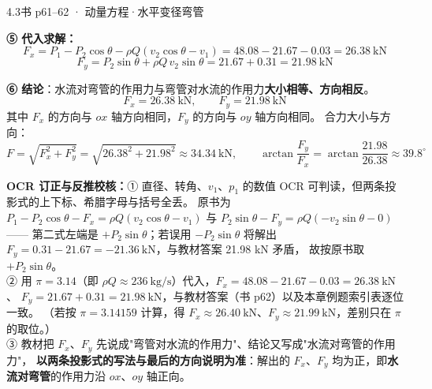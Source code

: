 \begin{liti}{4.3}{书 p61--62 · 动量方程·水平变径弯管}
\begin{jie}
\textbf{⑤ 代入求解：}
\[ F_x=P_1-P_2\cos\theta-\rho Q\left(v_2\cos\theta-v_1\right)=48.08-21.67-0.03=26.38\ \mathrm{kN} \]
\[ F_y=P_2\sin\theta+\rho Q\,v_2\sin\theta=21.67+0.31=21.98\ \mathrm{kN} \]

\textbf{⑥ 结论}：水流对弯管的作用力与弯管对水流的作用力\textbf{大小相等、方向相反}。
\[ F_x=26.38\ \mathrm{kN},\qquad F_y=21.98\ \mathrm{kN} \]
其中 $F_x$ 的方向与 $ox$ 轴方向相同，$F_y$ 的方向与 $oy$ 轴方向相同。
合力大小与方向：
\[ F=\sqrt{F_x^2+F_y^2}=\sqrt{26.38^2+21.98^2}\approx34.34\ \mathrm{kN},\qquad \arctan\frac{F_y}{F_x}=\arctan\frac{21.98}{26.38}\approx39.8^{\circ} \]
\end{jie}
\end{liti}

\begin{tishi}
\textbf{OCR 订正与反推校核：}① 直径、转角、$v_1$、$p_1$ 的数值 OCR 可判读，但两条投影式的上下标、希腊字母与括号全丢。
原书为 $P_1-P_2\cos\theta-F_x=\rho Q(v_2\cos\theta-v_1)$ 与 $P_2\sin\theta-F_y=\rho Q(-v_2\sin\theta-0)$ ——
第二式左端是 $+P_2\sin\theta$；若误用 $-P_2\sin\theta$ 将解出 $F_y=0.31-21.67=-21.36\ \mathrm{kN}$，与教材答案 21.98 kN 矛盾，
故按原书取 $+P_2\sin\theta$。\\
② 用 $\pi=3.14$（即 $\rho Q\approx236\ \mathrm{kg/s}$）代入，$F_x=48.08-21.67-0.03=26.38\ \mathrm{kN}$、
$F_y=21.67+0.31=21.98\ \mathrm{kN}$，与教材答案（书 p62）以及本章例题索引表逐位一致。
（若按 $\pi=3.14159$ 计算，得 $F_x\approx26.40\ \mathrm{kN}$、$F_y\approx21.99\ \mathrm{kN}$，差别只在 $\pi$ 的取位。）\\
③ 教材把 $F_x$、$F_y$ 先说成"弯管对水流的作用力"、结论又写成"水流对弯管的作用力"，
\textbf{以两条投影式的写法与最后的方向说明为准}：解出的 $F_x$、$F_y$ 均为正，即\textbf{水流对弯管}的作用力沿 $ox$、$oy$ 轴正向。
\end{tishi}

